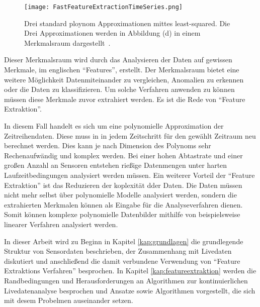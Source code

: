 \begin{figure}
  \centering
  \texttt{[image: FastFeatureExtractionTimeSeries.png]}
  \caption{Drei standard ploynom Approximationen mittes least-squared. Die Drei Approximationen werden in Abbildung (d) in einem Merkmalsraum dargestellt~\cite{gensler2015fast}.}
  \label{fig:FFETimeSeries}
\end{figure}


Dieser Merkmalsraum wird durch das Analysieren der Daten auf gewissen Merkmale, im englischen \enquote{Features}, erstellt.
Der Merkmalsraum bietet eine weitere Möglichkeit Datenmiteinander zu vergleichen, Anomalien zu erkennen oder die Daten zu klassifizieren. 
Um solche Verfahren anwenden zu können müssen diese Merkmale zuvor extrahiert werden. 
Es ist die Rede von \enquote{Feature Extraktion}.

In diesem Fall handelt es sich um eine polynomielle Approximation der Zeitreihendaten. 
Diese muss in in jedem Zeitschritt für den gewählt Zeitraum neu berechnet werden. 
Dies kann je nach Dimension des Polynoms sehr Rechenaufwändig und komplex werden.
Bei einer hohen Abtastrate und einer großen Anzahl an Sensoren entstehen rießige Datenmengen unter harten Laufzeitbedingungen analysiert werden müssen.
Ein weiterer Vorteil der \enquote{Feature Extraktion} ist das Reduzieren der koplexität dder Daten. Die Daten müssen nicht mehr selbst über polynomielle Modelle analysiert werden, sondern die extrahierten Merkmalen können als Eingabe für die Analyseverfahren dienen. Somit können komplexe polynomielle Datenbilder mithilfe von beispielsweise linearer Verfahren analysiert werden.

In dieser Arbeit wird zu Beginn in Kapitel \ref{kap:grundlagen} die grundlegende Struktur von Sensordaten beschrieben, der Zusammenhang mit Livedaten diskutiert und anschließend die damit verbundene Verwendung von \enquote{Feature Extraktions Verfahren} besprochen. 
In Kapitel \ref{kap:featureextraktion} werden die Randbedingungen und Herausforderungen an Algorithmen zur kontinuierlichen Livedatenanalyse besprochen und Ansatze sowie Algorithmen vorgestellt, die sich mit desem Probelmen auseinander setzen.